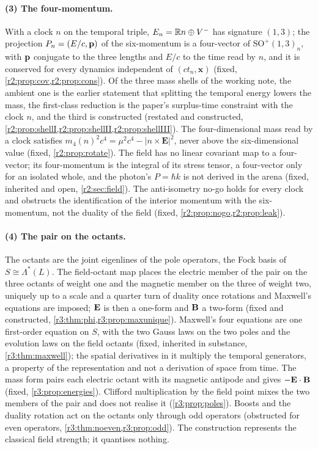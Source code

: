 \paragraph{(3) The four-momentum.} With a clock $n$ on the temporal triple, $E_n=\mathbb{R} n\oplus V^-$ has signature $(1,3)$; the projection
$P_n=(E/c,\mathbf p)$ of the six-momentum is a four-vector of $\mathrm{SO}^+(1,3)_n$, with $\mathbf p$ conjugate to the three lengths and $E/c$ to the
time read by $n$, and it is conserved for every dynamics independent of $(ct_n,\mathbf x)$ (fixed, \cref{r2:prop:cov,r2:prop:cons}). Of
the three mass shells of the working note, the ambient one is the earlier statement that splitting the temporal energy lowers the mass,
the first-class reduction is the paper's surplus-time constraint with the clock $n$, and the third is constructed (restated and
constructed, \cref{r2:prop:shellI,r2:prop:shellII,r2:prop:shellIII}). The four-dimensional mass read by a clock satisfies
$m_4(n)^2c^4=\mu^2c^4-|n\times\mathbf E|^2$, never above the six-dimensional value (fixed, \cref{r2:prop:rotate}). The field has no linear
covariant map to a four-vector; its four-momentum is the integral of its stress tensor, a four-vector only for an isolated whole, and
the photon's $P=\hbar k$ is not derived in the arena (fixed, inherited and open, \cref{r2:sec:field}). The anti-isometry no-go holds for
every clock and obstructs the identification of the interior momentum with the six-momentum, not the duality of the field
(fixed, \cref{r2:prop:nogo,r2:prop:leak}).

\paragraph{(4) The pair on the octants.} The octants are the joint eigenlines of the pole operators, the Fock basis of $S\cong\Lambda^*(L)$.
The field-octant map places the electric member of the pair on the three octants of weight one and the magnetic member on the three of
weight two, uniquely up to a scale and a quarter turn of duality once rotations and Maxwell's equations are imposed; $\mathbf E$ is then a
one-form and $\mathbf B$ a two-form (fixed and constructed, \cref{r3:thm:phi,r3:prop:maxunique}). Maxwell's four equations are one first-order
equation on $S$, with the two Gauss laws on the two poles and the evolution laws on the field octants (fixed, inherited in substance,
\cref{r3:thm:maxwell}); the spatial derivatives in it multiply the temporal generators, a property of the representation and not a
derivation of space from time. The mass form pairs each electric octant with its magnetic antipode and gives $-\mathbf E\cdot\mathbf B$ (fixed,
\cref{r3:prop:energies}). Clifford multiplication by the field point mixes the two members of the pair and does not realise it
(\cref{r3:prop:poles}). Boosts and the duality rotation act on the octants only through odd operators (obstructed for even operators,
\cref{r3:thm:noeven,r3:prop:odd}). The construction represents the classical field strength; it quantises nothing.

